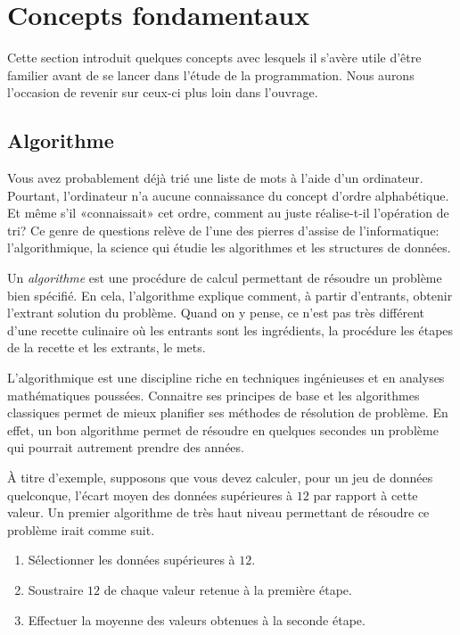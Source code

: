 \section{Concepts fondamentaux}
\label{sec:informatique:concepts}

Cette section introduit quelques concepts avec lesquels il s'avère
utile d'être familier avant de se lancer dans l'étude de la
programmation. Nous aurons l'occasion de revenir sur ceux-ci plus loin
dans l'ouvrage.

\subsection{Algorithme}
\label{sec:informatique:concepts:algorithme}

Vous avez probablement déjà trié une liste de mots à l'aide d'un
ordinateur. Pourtant, l'ordinateur n'a aucune connaissance du concept
d'ordre alphabétique. Et même s'il «connaissait» cet ordre, comment au
juste réalise-t-il l'opération de tri? Ce genre de questions relève de
l'une des pierres d'assise de l'informatique:
l'algorithmique, la science qui étudie les
algorithmes et les structures de données.

Un \emph{algorithme} est une procédure de calcul
permettant de résoudre un problème bien spécifié. En cela,
l'algorithme explique comment, à partir d'entrants, obtenir l'extrant
solution du problème. Quand on y pense, ce n'est pas très différent
d'une recette culinaire où les entrants sont les ingrédients, la
procédure les étapes de la recette et les extrants, le mets.

L'algorithmique est une discipline riche en techniques ingénieuses et
en analyses mathématiques poussées. Connaitre ses principes de base et
les algorithmes classiques permet de mieux planifier ses méthodes de
résolution de problème. En effet, un bon algorithme permet de résoudre
en quelques secondes un problème qui pourrait autrement prendre des
années.

À titre d'exemple, supposons que vous devez calculer, pour un jeu de
données quelconque, l'écart moyen des données supérieures à $12$ par
rapport à cette valeur. Un premier algorithme de très haut niveau
permettant de résoudre ce problème irait comme suit.

\begin{Schunk}
  \begin{enumerate}
  \item Sélectionner les données supérieures à $12$.
  \item Soustraire $12$ de chaque valeur retenue à la première étape.
  \item Effectuer la moyenne des valeurs obtenues à la seconde étape.
  \end{enumerate}
\end{Schunk}


